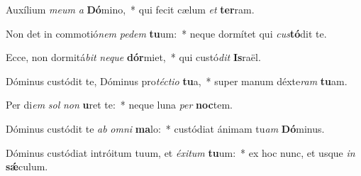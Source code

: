 \item Auxílium \textit{me}\textit{um} \textit{a} \textbf{Dó}mino,~* qui fecit cælum \textit{et} \textbf{ter}ram.
\item Non det in commotió\textit{nem} \textit{pe}\textit{dem} \textbf{tu}um:~* neque dormítet qui \textit{cus}\textbf{tó}dit te.
\item Ecce, non dormitá\textit{bit} \textit{ne}\textit{que} \textbf{dór}miet,~* qui custó\textit{dit} \textbf{Is}raël.
\item Dóminus custódit te, Dóminus pro\textit{téc}\textit{ti}\textit{o} \textbf{tu}a,~* super manum déxte\textit{ram} \textbf{tu}am.
\item Per di\textit{em} \textit{sol} \textit{non} \textbf{u}ret te:~* neque luna \textit{per} \textbf{noc}tem.
\item Dóminus custódit te \textit{ab} \textit{om}\textit{ni} \textbf{ma}lo:~* custódiat ánimam tu\textit{am} \textbf{Dó}minus.
\item Dóminus custódiat intróitum tuum, et \textit{éx}\textit{i}\textit{tum} \textbf{tu}um:~* ex hoc nunc, et usque \textit{in} \textbf{sǽ}culum.
